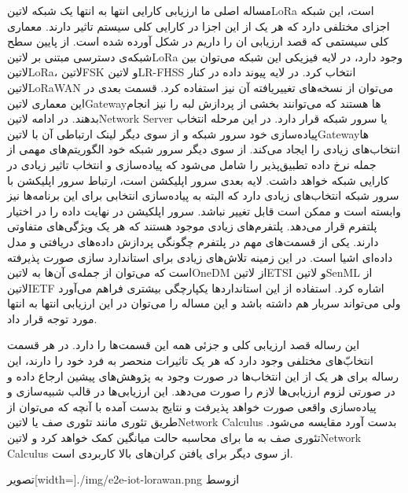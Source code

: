 
مساله اصلی ما ارزیابی کارایی انتها به انتها یک شبکه ‌لاتین{LoRa} است، این شبکه اجزای مختلفی دارد که هر یک از این اجزا در کارایی کلی سیستم تاثیر دارند.
معماری کلی سیستمی که قصد ارزیابی ان را داریم در شکل  آورده شده است.
از پایین سطح شبکه‌ی دسترسی مبتنی بر ‌لاتین{LoRa} وجود دارد، در لایه فیزیکی این شبکه می‌توان بین ‌لاتین{LoRa}، ‌لاتین{FSK}
و ‌لاتین{LR-FHSS} انتخاب کرد. در لایه پیوند داده در کنار ‌لاتین{LoRaWAN} می‌توان از نسخه‌های تغییریافته آن نیز استفاده کرد.
قسمت بعدی در این معماری ‌لاتین{Gateway}ها هستند که می‌توانند بخشی از پردازش لبه را نیز انجام بدهند.
در ادامه ‌لاتین{Network Server} یا سرور شبکه قرار دارد. در این مرحله انتخاب پیاده‌سازی خود سرور شبکه و از سوی دیگر لینک ارتباطی آن با
‌لاتین{Gateway}ها انتخاب‌های زیادی را ایجاد می‌کند. از سوی دیگر سرور شبکه خود الگوریتم‌های مهمی از جمله نرخ داده تطبیق‌پذیر را شامل می‌شود
که پیاده‌سازی و انتخاب تاثیر زیادی در کارایی شبکه خواهد داشت.
لایه بعدی سرور اپلیکشن است، ارتباط سرور اپلیکشن با سرور شبکه انتخاب‌های زیادی دارد که البته به پیاده‌سازی انتخابی برای این برنامه‌ها نیز وابسته است
و ممکن است قابل تغییر نباشد.
سرور اپلکیشن در نهایت داده را در اختیار پلتفرم قرار می‌دهد. پلتفرم‌های زیادی موجود هستند که هر یک ویژگی‌های متفاوتی دارند. یکی از قسمت‌های مهم
در پلتفرم چگونگی پردازش داده‌های دریافتی و مدل داده‌ای اشیا است. در این زمینه تلاش‌های زیادی برای استاندارد سازی صورت پذیرفته است که می‌توان از
جمله‌ی آن‌ها به ‌لاتین{OneDM} از ‌لاتین{ETSI} و ‌لاتین{SenML} از ‌لاتین{IETF} اشاره کرد. استفاده از این استانداردها یکپارچگی
بیشتری فراهم می‌آورد ولی می‌تواند سربار هم داشته باشد و این مساله را می‌توان در این ارزیابی انتها به انتها مورد توجه قرار داد.

این رساله قصد ارزیابی کلی و جزئی همه این قسمت‌ها را دارد. در هر قسمت انتخاب‌ّهای مختلفی وجود دارد که هر یک تاثیرات منحصر به فرد خود را دارند،
این رساله برای هر یک از این انتخاب‌ها در صورت وجود به پژوهش‌های پیشین ارجاع داده و در صورتی لزوم ارزیابی‌ها لازم را صورت می‌دهد.
این ارزیابی‌ها در قالب شبیه‌سازی و پیاده‌سازی واقعی صورت خواهد پذیرفت و نتایج بدست آمده با آنچه که می‌توان از طریق تئوری مانند تئوری صف یا ‌لاتین{Network Calculus}
بدست آورد مقایسه می‌شود. تئوری صف به ما برای محاسبه حالت میانگین کمک خواهد کرد و ‌لاتین{Network Calculus} از سوی دیگر برای یافتن کران‌های بالا کاربردی است.

‌تصویر[width=\textwidth]{./img/e2e-iot-lorawan.png}
‌ازوسط

